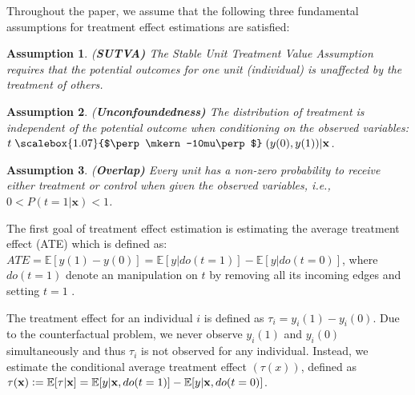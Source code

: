 \documentclass[letterpaper]{article} %
\newcommand{\bigCI}{\mathrel{\text{\scalebox{1.07}{$\perp\mkern-10mu\perp$}}}}
\begin{document}
Throughout the paper, we assume that the following three fundamental assumptions for treatment effect estimations \cite{Rosenbaum1983} are satisfied:
\newtheorem{assumption}{Assumption}
\begin{assumption}
	(\textbf{SUTVA)} The Stable Unit Treatment Value Assumption requires that the potential outcomes for one unit (individual) is unaffected by the treatment of others.
\end{assumption}

\begin{assumption}
	(\textbf{Unconfoundedness)} The distribution of treatment is independent of the potential outcome when conditioning on the observed variables: $t \bigCI (y(0), y(1)) | \mathbf{x}$.
	\label{unconfound}
\end{assumption}

\begin{assumption}
	(\textbf{Overlap)} Every unit has a non-zero probability to receive either treatment or control when given the observed variables, i.e., $0< P(t=1|\mathbf{x})<1$.
	\label{overslap}
\end{assumption}

The first goal of treatment effect estimation is estimating the average treatment effect (ATE) which is defined as: $ATE = \mathbb{E}[y(1) - y(0)] = \mathbb{E}[y|do(t=1)] - \mathbb{E}[y|do(t=0)]$,
where $do(t=1)$ denote an manipulation on $t$ by removing all its incoming edges and setting $t=1$ \cite{Pearl2009}.

The treatment effect for an individual $i$ is defined as $\tau_i = y_i(1) - y_i(0)$.
Due to the counterfactual problem, we never observe $y_i(1)$ and $y_i(0)$ simultaneously and thus $\tau_i$ is not observed for any individual. Instead, we estimate the conditional average treatment effect $(\tau(x))$, defined as $\tau(\mathbf{x}) \vcentcolon = \mathbb{E}[\tau|\mathbf{x}] =  \mathbb{E}[y|\mathbf{x}, do(t=1)] - \mathbb{E}[y|\mathbf{x},do(t=0)]$.
\end{document}
